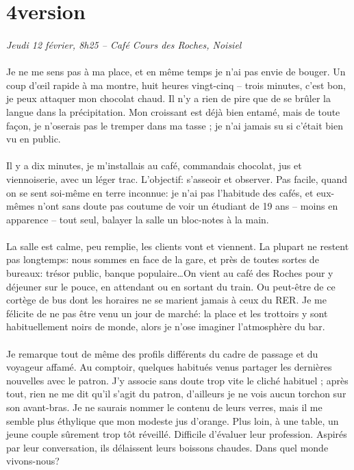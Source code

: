 \section{4\ieme version}

\paragraph{}
\emph{Jeudi 12 février, 8h25 – Café Cours des Roches, Noisiel}

\paragraph{} Je ne me sens pas à ma place, et en même temps je n'ai pas envie
de bouger. Un coup d'œil rapide à ma montre, huit heures vingt-cinq – trois
minutes, c'est bon, je peux attaquer mon chocolat chaud. Il n'y a rien de pire
que de se brûler la langue dans la précipitation. Mon croissant est déjà bien
entamé, mais de toute façon, je n'oserais pas le tremper dans ma tasse ; je
n'ai jamais su si c'était bien vu en public.

\paragraph{} Il y a dix minutes, je m'installais au café, commandais chocolat,
jus et viennoiserie, avec un léger trac. L'objectif: s'asseoir et observer.
Pas facile, quand on se sent soi-même en terre inconnue: je n'ai pas l'habitude
des cafés, et eux-mêmes n'ont sans doute pas coutume de voir un étudiant de 19
ans – moins en apparence – tout seul, balayer la salle un bloc-notes à la main.

\paragraph{} La salle est calme, peu remplie, les clients vont et viennent. La
plupart ne restent pas longtemps: nous sommes en face de la gare, et près de
toutes sortes de bureaux: trésor public, banque populaire\ldots On vient au
café des Roches pour y déjeuner sur le pouce, en attendant ou en sortant du
train.  Ou peut-être de ce cortège de bus dont les horaires ne se marient
jamais à ceux du RER. Je me félicite de ne pas être venu un jour de marché: la
place et les trottoirs y sont habituellement noirs de monde, alors je n'ose
imaginer l'atmosphère du bar.

\paragraph{} Je remarque tout de même des profils différents du cadre de
passage et du voyageur affamé. Au comptoir, quelques habitués venus partager
les dernières nouvelles avec le patron. J'y associe sans doute trop vite le
cliché habituel ; après tout, rien ne me dit qu'il s'agit du patron, d'ailleurs
je ne vois aucun torchon sur son avant-bras. Je ne saurais nommer le contenu de
leurs verres, mais il me semble plus éthylique que mon modeste jus d'orange.
Plus loin, à une table, un jeune couple sûrement trop tôt réveillé. Difficile
d'évaluer leur profession. Aspirés par leur conversation, ils délaissent leurs
boissons chaudes. Dans quel monde vivons-nous?

